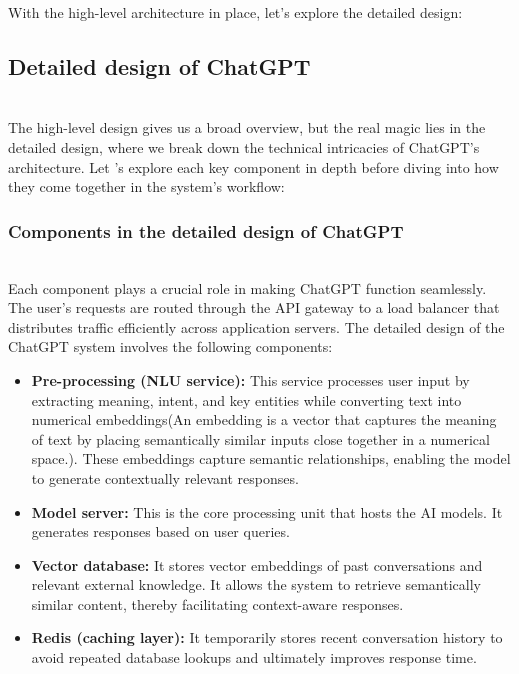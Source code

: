 With the high-level architecture in place, let's explore the detailed design:

\subsection{Detailed design of ChatGPT}\label{2uyoYloq392NOnVAQpxw2}
\\
The high-level design gives us a broad overview, but the real magic lies in the detailed design, where we break down the technical intricacies of ChatGPT's architecture. Let 's explore each key component in depth before diving into how they come together in the system's workflow:

\subsubsection{Components in the detailed design of ChatGPT}\label{Dp-oV8vBCIZ8w3xOZRst2}
\\
Each component plays a crucial role in making ChatGPT function seamlessly. The user's requests are routed through the API gateway to a load balancer that distributes traffic efficiently across application servers. The detailed design of the ChatGPT system involves the following components:

\begin{itemize}
\item
\protect{}\label{ZK0otXLDeQr-cm9sN2UUs}
\textbf{Pre-processing (NLU service):} This service processes user input by extracting meaning, intent, and key entities while converting text into numerical embeddings(An embedding is a vector that captures the meaning of text by placing semantically similar inputs close together in a numerical space.). These embeddings capture semantic relationships, enabling the model to generate contextually relevant responses.
\item
\protect{}\label{Z4PvTtfFUfn89Z_4amKzx}
\textbf{Model server:} This is the core processing unit that hosts the AI models. It generates responses based on user queries.
\item
\protect{}\label{6AWcUc2qsht4YolKCgFEI}
\textbf{Vector database:} It stores vector embeddings of past conversations and relevant external knowledge. It allows the system to retrieve semantically similar content, thereby facilitating context-aware responses.
\item
\protect{}\label{3XTsOqUAZtGOnFe0kGnsh}
\textbf{Redis (caching layer):} It temporarily stores recent conversation history to avoid repeated database lookups and ultimately improves response time.
\end{itemize}

